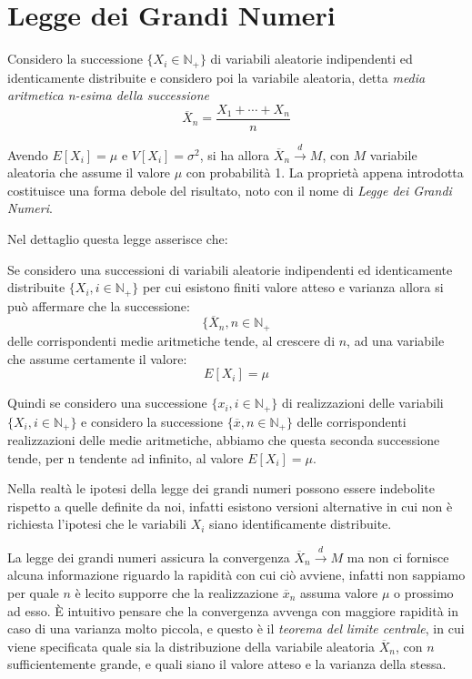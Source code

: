 \documentclass[a4paper,12pt, oneside]{book}
\newcommand{\numberset}{\mathbb}
\newcommand{\N}{\numberset{N}}
\begin{document}
\section{Legge dei Grandi Numeri}
Considero la successione $\{X_i \in \N_+\}$ di variabili aleatorie indipendenti ed identicamente distribuite e
considero poi la variabile aleatoria, detta \emph{media aritmetica n-esima della successione}
\[ \overline{X}_n = \frac{X_1 + \cdots + X_n}{n}\]

Avendo $E[X_i] = \mu$ e $V[X_i] = \sigma^2$, si ha allora $\overline{X}_n \stackrel{d}{\longrightarrow} M$,
con $M$ variabile aleatoria che assume il valore $\mu$ con probabilità 1.\newline
La proprietà appena introdotta costituisce una forma debole del risultato, noto con il nome di \emph{Legge dei Grandi Numeri}.

Nel dettaglio questa legge asserisce che:
\begin{teorema}
Se considero una successioni di variabili aleatorie indipendenti ed identicamente distribuite $\{X_i, i \in \N_+\}$
per cui esistono finiti valore atteso e varianza allora si può affermare che la successione:
\[\{\overline{X}_n, n \in \N_+\]
delle corrispondenti medie aritmetiche tende, al crescere di $n$, ad una variabile che assume certamente il valore:
\[E[X_i]=\mu\]
\end{teorema}
Quindi se considero una successione $\{x_i, i \in \N_+\}$ di realizzazioni delle variabili $\{X_i, i \in \N_+\}$
e considero la successione $\{\overline{x}, n \in \N_+\}$ delle corrispondenti realizzazioni delle medie aritmetiche,
abbiamo che questa seconda successione tende, per n tendente ad infinito, al valore $E[X_i] = \mu$.

Nella realtà le ipotesi della legge dei grandi numeri possono essere indebolite rispetto a quelle definite da
noi, infatti esistono versioni alternative in cui non è richiesta l'ipotesi che le variabili $X_i$ siano
identificamente distribuite.

La legge dei grandi numeri assicura la convergenza $\overline{X}_n \stackrel{d}{\longrightarrow} M$ ma non ci
fornisce alcuna informazione riguardo la rapidità con cui ciò avviene, infatti non sappiamo per quale $n$ è
lecito supporre che la realizzazione $\overline{x}_n$ assuma valore $\mu$ o prossimo ad esso.\newline
È intuitivo pensare che la convergenza avvenga con maggiore rapidità in caso di una varianza molto piccola, e
questo è il \emph{teorema del limite centrale}, in cui viene specificata quale sia la distribuzione della
variabile aleatoria $\overline{X}_n$, con $n$ sufficientemente grande, e quali siano il valore atteso e la
varianza della stessa.
\end{document}
